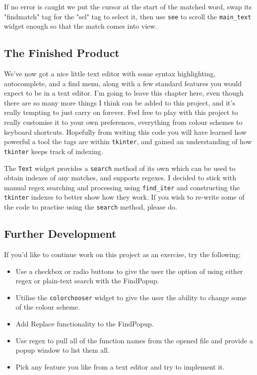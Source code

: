 \documentclass[a4paper,11pt,openany]{book}
\begin{document}
\vspace{5mm}

If no error is caught we put the cursor at the start of the matched word, swap its "findmatch" tag for the "sel" tag to select it, then use \lstinline[columns=fixed]{see} to scroll the \lstinline[columns=fixed]{main_text} widget enough so that the match comes into view.   

\subsection{The Finished Product}

We've now got a nice little text editor with some syntax highlighting, autocomplete, and a find menu, along with a few standard features you would expect to be in a text editor. I'm going to leave this chapter here, even though there are so many more things I think can be added to this project, and it's really tempting to just carry on forever. Feel free to play with this project to really customise it to your own preferences, everything from colour schemes to keyboard shortcuts. Hopefully from writing this code you will have learned how powerful a tool the tags are within \lstinline[columns=fixed]{tkinter}, and gained an understanding of how \lstinline[columns=fixed]{tkinter} keeps track of indexing. 

\vspace{5mm}

The \lstinline[columns=fixed]{Text} widget provides a \lstinline[columns=fixed]{search} method of its own which can be used to obtain indexes of any matches, and supports regexes. I decided to stick with manual regex searching and processing using \lstinline[columns=fixed]{find_iter} and constructing the \lstinline[columns=fixed]{tkinter} indexes to better show how they work. If you wish to re-write some of the code to practise using the \lstinline[columns=fixed]{search} method, please do.  

\subsection{Further Development}
If you'd like to continue work on this project as an exercise, try the following:

\begin{itemize}
  \item Use a checkbox or radio buttons to give the user the option of using either regex or plain-text search with the FindPopup.
  \item Utilise the \lstinline[columns=fixed]{colorchooser} widget to give the user the ability to change some of the colour scheme. 
  \item Add Replace functionality to the FindPopup.
  \item Use regex to pull all of the function names from the opened file and provide a popup window to list them all.
  \item Pick any feature you like from a text editor and try to implement it. 
\end{itemize}
\end{document}
